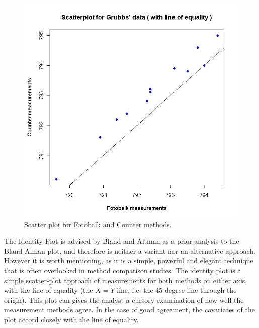 \documentclass[12pt, a4paper]{report}
\theoremstyle{plain}
\theoremstyle{definition}
\theoremstyle{remark}
\begin{document}
	\begin{figure}[h!]
		\begin{center}
			\includegraphics[width=125mm]{images/GrubbsScatter.jpeg}
			\caption{Scatter plot for Fotobalk and Counter methods.}\label{GrubbsScatter}
		\end{center}
	\end{figure}
The Identity Plot is advised by Bland and Altman as a prior analysis to the Bland-Alman plot, and therefore is neither a variant nor an alternative approach. However it is worth mentioning, as it is a simple, powerful and elegant technique that is often overlooked in method comparison studies. The identity plot is a simple scatter-plot approach of measurements for both methods on either axis, with the line of equality (the $X=Y$ line, i.e. the 45 degree line through the origin). This plot can gives the analyst a cursory examination of how well the measurement methods agree. In the case of good agreement, the covariates of the plot accord closely with the line of equality.
		
\end{document}
